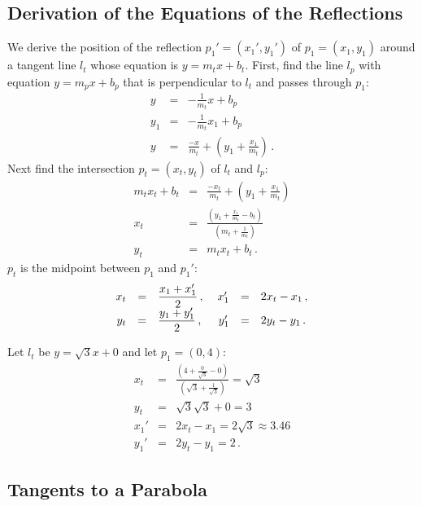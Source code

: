 
\subsection{Derivation of the Equations of the Reflections}
We derive the position of the reflection $p_1'=(x_1',y_1')$ of $p_1=(x_1,y_1)$ around a tangent line $l_t$ whose equation is $y=m_tx+b_t$. First, find the line $l_p$ with equation $y=m_px+b_p$ that is perpendicular to $l_t$ and passes through $p_1$:
\begin{eqnarray*}
y&=&-\frac{1}{m_t}x+b_p\\
y_1&=&-\frac{1}{m_t}x_1+b_p\\
y&=&\frac{-x}{m_t}+\left(y_1+\frac{x_1}{m_t}\right)\,.
\end{eqnarray*}
Next find the intersection $p_t=(x_t,y_t)$ of $l_t$ and $l_p$:
%
\begin{eqnarray*}
m_tx_t+b_t&=&\frac{-x_t}{m_t}+\left(y_1+\frac{x_1}{m_t}\right)\\
x_t&=&\frac{\left(y_1+\displaystyle\frac{x_1}{m_t}-b_t\right)}{\left(m_t+\displaystyle\frac{1}{m_t}\right)}\\
y_t&=&m_tx_t+b_t\,.
\end{eqnarray*}
$p_t$ is the midpoint between $p_1$ and $p_1'$:
\[
\begin{array}{rcl@{\hspace{3ex}}rcl}
x_t&=&\displaystyle\frac{x_1+x_1'}{2}\,, &x_1'&=&2x_t-x_1\,,\\
y_t&=&\displaystyle\frac{y_1+y_1'}{2}\,,& y_1'&=&2y_t-y_1\,.
\end{array}
\]

\newpage

\begin{example}
Let $l_t$ be $y=\sqrt{3}x+0$ and let $p_1=(0,4)$:
\begin{eqnarray*}
x_t&=&\frac{\left(4+\displaystyle\frac{0}{\sqrt{3}}-0\right)}{\left(\sqrt{3}+\displaystyle\frac{1}{\sqrt{3}}\right)}=\sqrt{3}\\
y_t&=&\sqrt{3}\sqrt{3}+0=3\\
x_1'&=&2x_t-x_1=2\sqrt{3}\approx 3.46\\
y_1'&=&2y_t-y_1= 2\,.
\end{eqnarray*}
\end{example}


\subsection{Tangents to a Parabola}\label{s.parabola}

